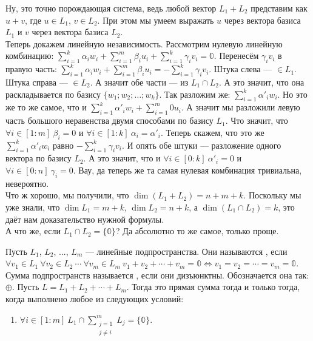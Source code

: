 \documentclass{article}
\begin{document}
\begin{itemize}
\begin{Proof}
            Ну, это точно порождающая система, ведь любой вектор $L_1+L_2$ представим как $u+v$, где $u\in L_1$, $v\in L_2$. При этом мы умеем выражать $u$ через вектора базиса $L_1$ и $v$ через вектора базиса $L_2$.\\
            Теперь докажем линейную независимость. Рассмотрим нулевую линейную комбинацию: $\sum\limits_{i=1}^k\alpha_iw_i+\sum\limits_{i=1}^m\beta_iu_i+\sum\limits_{i=1}^k\gamma_iv_i=\mathbb0$. Перенесём $\gamma_iv_i$ в правую часть: $\sum\limits_{i=1}^k\alpha_iw_i+\sum\limits_{i=1}^m\beta_iu_i=-\sum\limits_{i=1}^k\gamma_iv_i$. Штука слева --- $\in L_1$. Штука справа --- $\in L_2$. А значит обе части --- из $L_1\cap L_2$. А это значит, что она раскладывается по базису $\{w_1;w_2;\ldots;w_k\}$. Так разложим же: $\sum\limits_{i=1}^k\alpha'_iw_i$. Но это же то же самое, что и $\sum\limits_{i=1}^k\alpha'_iw_i+\sum\limits_{i=1}^m0u_i$. А значит мы разложили левую часть большого неравенства двумя способами по базису $L_1$. Что значит, что $\forall i\in[1:m]~\beta_i=0$ и $\forall i\in[1:k]~\alpha_i=\alpha'_i$. Теперь скажем, что это же $\sum\limits_{i=1}^k\alpha'_iw_i$ равно $-\sum\limits_{i=1}^k\gamma_iv_i$. И опять обе штуки --- разложение одного вектора по базису $L_2$. А это значит, что и $\forall i\in[0:k]~\alpha'_i=0$ и $\forall i\in[0:n]~\gamma_i=0$. Вау, да теперь же та самая нулевая комбинация тривиальна, невероятно.\\
            Что ж хорошо, мы получили, что $\dim(L_1+L_2)=n+m+k$. Поскольку мы уже знали, что $\dim L_1=m+k$, $\dim L_2=n+k$, а $\dim(L_1\cap L_2)=k$, это даёт нам доказательство нужной формулы.\\
            А что же, если $L_1\cap L_2=\{\mathbb0\}$? Да абсолютно то же самое, только проще.
        \end{Proof}
        \dfn Пусть $L_1$, $L_2$, ..., $L_m$ --- линейные подпространства. Они называются , если $\forall v_1\in L_1~\forall v_2\in L_2~\cdots~\forall v_m\in L_m~v_1+v_2+\cdots+v_m=\mathbb0\Leftrightarrow v_1=v_2=\cdots=v_m=\mathbb0$.
        \dfn Сумма подпространств называется , если они дизъюнктны. Обозначается она так: $\oplus$.
        \thm Пусть $L=L_1+L_2+\cdots+L_m$. Тогда это прямая сумма тогда и только тогда, когда выполнено любое из следующих условий:
        \begin{enumerate}
            \item $\forall i\in[1:m]~L_1\cap\sum\limits_{\substack{j=1\\j\neq i}}^mL_j=\{\mathbb0\}$.

\end{enumerate}
\end{itemize}
\end{document}
